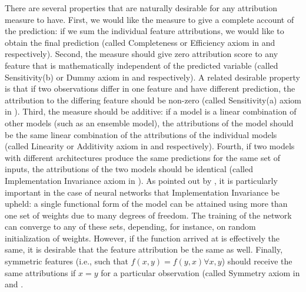 			There are several properties that are naturally desirable for any attribution measure to have. First, we would like the measure to give a complete account of the prediction: if we sum the individual feature attributions, we would like to obtain the final prediction (called Completeness or Efficiency axiom in \cite{sundararajan2017axiomatic} and \cite{molnar2020interpretable} respectively). Second, the measure should give zero attribution score to any feature that is mathematically independent of the predicted variable (called Sensitivity(b) or Dummy axiom in \cite{sundararajan2017axiomatic} and \cite{molnar2020interpretable} respectively). A related desirable property is that if two observations differ in one feature and have different prediction, the attribution to the differing feature should be non-zero (called Sensitivity(a) axiom in \cite{sundararajan2017axiomatic}). Third, the measure should be additive: if a model is a linear combination of other models (such as an ensemble model), the attributions of the model should be the same linear combination of the attributions of the individual models (called Linearity or Additivity axiom in \cite{sundararajan2017axiomatic} and \cite{molnar2020interpretable} respectively). Fourth, if two models with different architectures produce the same predictions for the same set of inputs, the attributions of the two models should be identical (called Implementation Invariance axiom in \cite{sundararajan2017axiomatic}). As pointed out by \cite{sundararajan2017axiomatic}, it is particularly important in the case of neural networks that Implementation Invariance be upheld: a single functional form of the model can be attained using more than one set of weights due to many degrees of freedom. The training of the network can converge to any of these sets, depending, for instance, on random initialization of weights. However, if the function arrived at is effectively the same, it is desirable that the feature attribution be the same as well. Finally, symmetric features (i.e., such that $f(x,y) = f(y,x) \forall x, y$) should receive the same attributions if $x=y$ for a particular observation (called Symmetry axiom in \cite{shrikumar2017learning} and  \cite{molnar2020interpretable}. 
			
